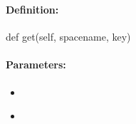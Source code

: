 %
%
%


\pagebreak
\subsubsection{}
\label{api:python:get}


\paragraph{Definition:}
\begin{pythoncode}
def get(self, spacename, key)
\end{pythoncode}

\paragraph{Parameters:}
\begin{itemize}[noitemsep]
\item {}\\

\item {}\\

\end{itemize}

